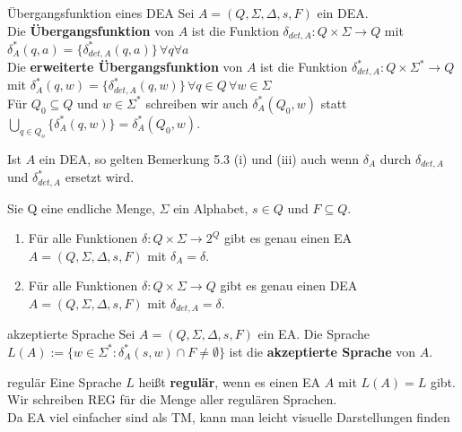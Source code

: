 \begin{defn}{Übergangsfunktion eines DEA}
    Sei $A = (Q,\Sigma,\Delta,s,F)$ ein DEA. \\
    
    Die \textbf{Übergangsfunktion} von $A$ ist die Funktion $\delta_{det,A}: Q \times \Sigma \rightarrow Q$ mit
    $\delta^*_A(q,a) = \{\delta^*_{det,A}(q,a)\} \, \forall q \forall a$ \\

    Die \textbf{erweiterte Übergangsfunktion} von $A$ ist die Funktion $\delta^*_{det,A} : Q \times \Sigma^* \rightarrow Q$
    mit $\delta^*_A(q,w) = \{\delta^*_{det,A}(q,w)\} \, \forall q \in Q \, \forall w \in \Sigma$ \\

    Für $Q_0 \subseteq Q$ und $w \in \Sigma^*$ schreiben wir auch $\delta^*_A(Q_0,w)$ statt $\bigcup\limits_{q \in Q_o}\{\delta^*_A(q,w)\} = \delta^*_A(Q_0,w)$.
\end{defn}

\begin{bem}
    Ist $A$ ein DEA, so gelten Bemerkung 5.3 (i) und (iii) auch wenn $\delta_A$ durch $\delta_{det,A}$ und $\delta^*_{det,A}$ ersetzt wird.
\end{bem}

\begin{bem}
    Sie Q eine endliche Menge, $\Sigma$ ein Alphabet, $s \in Q$ und $F \subseteq Q$. \\
    \begin{enumerate}
        \item Für alle Funktionen $\delta : Q \times \Sigma \rightarrow 2^Q$ gibt es genau einen EA $A = (Q,\Sigma,\Delta,s,F)$ mit $\delta_A = \delta$.
        \item Für alle Funktionen $\delta : Q \times \Sigma \rightarrow Q$ gibt es genau einen DEA $A =(Q,\Sigma, \Delta, s,F)$ mit $\delta_{det,A} = \delta$.
    \end{enumerate}
\end{bem}

\begin{defn}{akzeptierte Sprache}
    Sei $A = (Q,\Sigma, \Delta,s,F)$ ein EA. Die Sprache $L(A) := \{w \in \Sigma^* : \delta^*_A(s,w) \cap F \neq \emptyset\}$ ist die \textbf{akzeptierte Sprache} von $A$.
\end{defn}

\begin{defn}{regulär}
    Eine Sprache $L$ heißt \textbf{regulär}, wenn es einen EA $A$ mit $L(A) = L$ gibt. Wir schreiben REG für die Menge aller regulären Sprachen. \\

    Da EA viel einfacher sind als TM, kann man leicht visuelle Darstellungen finden
\end{defn}

